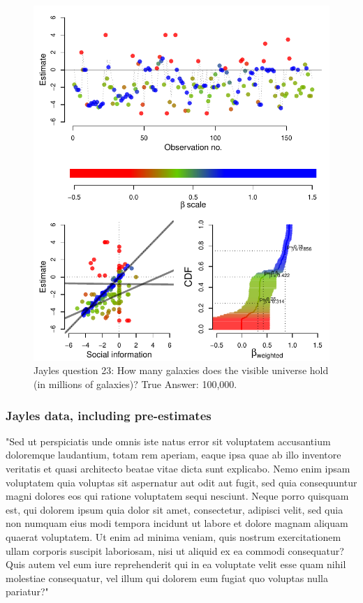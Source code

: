 \documentclass[9pt,twoside,lineno]{pnas-new}
\begin{document}
\begin{figure}[htbp]
	\centering\includegraphics[width=.5\textwidth]{../plots/jayles23.pdf}
	\caption{Jayles question 23: How many galaxies does the visible universe hold (in millions of galaxies)? True Answer: 100,000.}\label{fig: Jayles question 23}
\end{figure}


\subsubsection{Jayles data, including pre-estimates}


"Sed ut perspiciatis unde omnis iste natus error sit voluptatem accusantium doloremque laudantium, totam rem aperiam, eaque ipsa quae ab illo inventore veritatis et quasi architecto beatae vitae dicta sunt explicabo. Nemo enim ipsam voluptatem quia voluptas sit aspernatur aut odit aut fugit, sed quia consequuntur magni dolores eos qui ratione voluptatem sequi nesciunt. Neque porro quisquam est, qui dolorem ipsum quia dolor sit amet, consectetur, adipisci velit, sed quia non numquam eius modi tempora incidunt ut labore et dolore magnam aliquam quaerat voluptatem. Ut enim ad minima veniam, quis nostrum exercitationem ullam corporis suscipit laboriosam, nisi ut aliquid ex ea commodi consequatur? Quis autem vel eum iure reprehenderit qui in ea voluptate velit esse quam nihil molestiae consequatur, vel illum qui dolorem eum fugiat quo voluptas nulla pariatur?"
\end{document}
